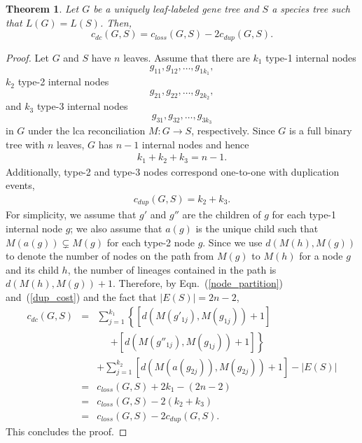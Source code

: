 \documentclass[9.5pt,journal,letterpaper,compsoc]{IEEEtran}
\newtheorem{theorem}{\bf Theorem}[section]
\begin{document}
\begin{theorem}
\label{thm31}
Let $G$ be a uniquely leaf-labeled gene tree and $S$ a species tree such
that $L(G)=L(S)$. Then,
  $$ c_{dc}(G, S) = c_{loss}(G, S) - 2c_{dup}(G, S).$$
\end{theorem}
\begin{proof}
Let $G$ and $S$ have $n$ leaves.
Assume that there are $k_1$ type-1 internal nodes
 $$ g_{11}, g_{12}, \ldots,  g_{1k_1},$$
$k_2$ type-2 internal nodes
 $$ g_{21}, g_{22}, \ldots, g_{2k_2}, $$
 and $k_3$ type-3  internal nodes
$$ g_{31}, g_{32}, \ldots, g_{3k_3}$$
in $G$ under the lca  reconciliation $M: G\rightarrow S$, respectively.
Since $G$ is a full binary tree with $n$ leaves, $G$
has   $n-1$ internal nodes and hence
\begin{eqnarray}
\label{node_partition}
 k_1+k_2+k_3 = n-1.
\end{eqnarray}
Additionally,  type-2 and type-3 nodes correspond one-to-one with
duplication events,
\begin{eqnarray}
\label{dup_cost}
  c_{dup}(G, S)= k_2+k_3.
\end{eqnarray}
For simplicity, we assume that
 $g'$ and $g''$ are the children of $g$ for each type-1 internal node $g$;
we also assume  that $a(g)$ is the
unique child such that $M\left(a(g)\right)\subsetneq M(g)$
for each type-2 node $g$.
Since we use  $d\left(M(h), M(g)\right)$ to denote the number of
nodes on the path from $M(g)$ to $M(h)$ for a node $g$ and its child $h$,
the number of lineages contained in the path is
$d\left(M(h), M(g)\right)+1$.  Therefore,
by Eqn.~(\ref{node_partition}) and~(\ref{dup_cost}) and  the fact that $|E(S)|=2n-2$,
\begin{eqnarray*}
  c_{dc}(G, S)& =& \sum ^{k_1} _{j=1}  \left\{ \left[d\left(M(g'_{1j}),
M(g_{1j})\right)+1\right]\right. \\
 & &\;\;\;\;\; \left. + \left[d\left(M(g''_{1j}), M(g_{1j})\right)+1\right]\right\}\\
 & & + \sum ^{k_2} _{j=1} \left[d\left(M(a(g_{2j})), M(g_{2j})\right)+1\right] -|E(S)|\\
  & = & c_{loss}(G, S) + 2k_1 - (2n-2)\\
  & = & c_{loss}(G, S) -2(k_2+k_3) \\
  &=  &  c_{loss} (G, S) - 2c_{dup}(G, S).
\end{eqnarray*}
This concludes the proof.
\end{proof}
\vspace{1em}
\end{document}
